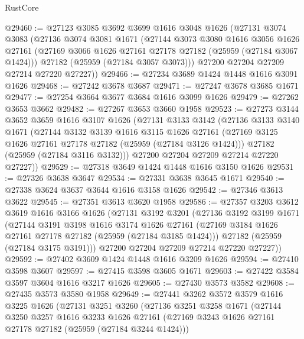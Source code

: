 \begin{lexlean}{RustCore}
\begin{coremodule}
@29460 := @27123
    @3085
    @3692
    @3699
    @1616
    @3048
    @1626
    (@27131
      @3074
      @3083
      (@27136
        @3074
        @3081
        @1671
        (@27144
          @3073
          @3080
          @1616
          @3056
          @1626
          @27161
          (@27169 @3066 @1626 @27161 @27178 @27182 (@25959 (@27184 @3067 @1424)))
          @27182
          (@25959 (@27184 @3057 @3073)))
        @27200
        @27204
        @27209
        @27214
        @27220
        @27227))
@29466 := @27234 @3689 @1424 @1448 @1616 @3091 @1626
@29468 := @27242 @3678 @3687
@29471 := @27247 @3678 @3685 @1671
@29477 := @27254 @3664 @3677 @3684 @1616 @3099 @1626
@29479 := @27262 @3653 @3662
@29482 := @27267 @3653 @3660 @1958
@29523 := @27273
    @3144
    @3652
    @3659
    @1616
    @3107
    @1626
    (@27131
      @3133
      @3142
      (@27136
        @3133
        @3140
        @1671
        (@27144
          @3132
          @3139
          @1616
          @3115
          @1626
          @27161
          (@27169 @3125 @1626 @27161 @27178 @27182 (@25959 (@27184 @3126 @1424)))
          @27182
          (@25959 (@27184 @3116 @3132)))
        @27200
        @27204
        @27209
        @27214
        @27220
        @27227))
@29529 := @27318 @3649 @1424 @1448 @1616 @3150 @1626
@29531 := @27326 @3638 @3647
@29534 := @27331 @3638 @3645 @1671
@29540 := @27338 @3624 @3637 @3644 @1616 @3158 @1626
@29542 := @27346 @3613 @3622
@29545 := @27351 @3613 @3620 @1958
@29586 := @27357
    @3203
    @3612
    @3619
    @1616
    @3166
    @1626
    (@27131
      @3192
      @3201
      (@27136
        @3192
        @3199
        @1671
        (@27144
          @3191
          @3198
          @1616
          @3174
          @1626
          @27161
          (@27169 @3184 @1626 @27161 @27178 @27182 (@25959 (@27184 @3185 @1424)))
          @27182
          (@25959 (@27184 @3175 @3191)))
        @27200
        @27204
        @27209
        @27214
        @27220
        @27227))
@29592 := @27402 @3609 @1424 @1448 @1616 @3209 @1626
@29594 := @27410 @3598 @3607
@29597 := @27415 @3598 @3605 @1671
@29603 := @27422 @3584 @3597 @3604 @1616 @3217 @1626
@29605 := @27430 @3573 @3582
@29608 := @27435 @3573 @3580 @1958
@29649 := @27441
    @3262
    @3572
    @3579
    @1616
    @3225
    @1626
    (@27131
      @3251
      @3260
      (@27136
        @3251
        @3258
        @1671
        (@27144
          @3250
          @3257
          @1616
          @3233
          @1626
          @27161
          (@27169 @3243 @1626 @27161 @27178 @27182 (@25959 (@27184 @3244 @1424)))

\end{coremodule}
\end{lexlean}
